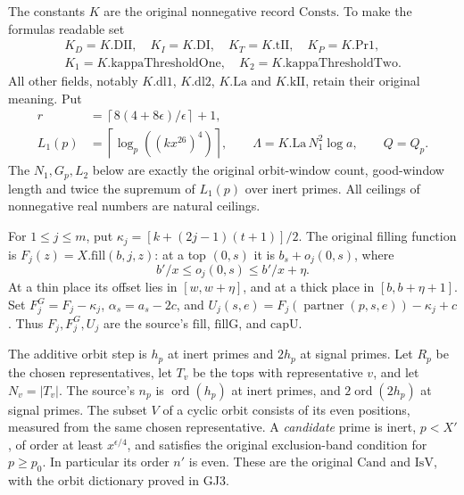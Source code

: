 The constants \(K\) are the original nonnegative record
\(\mathrm{Consts}\). To make the formulas readable set
\[
 \begin{gathered}
 K_D=K.\mathrm{DII},\quad K_I=K.\mathrm{DI},\quad
 K_T=K.\mathrm{tII},\quad K_P=K.\mathrm{Pr1},\\
 K_1=K.\mathrm{kappaThresholdOne},\quad
 K_2=K.\mathrm{kappaThresholdTwo}.
 \end{gathered}
\]
All other fields, notably \(K.\mathrm{dl1}\), \(K.\mathrm{dl2}\),
\(K.\mathrm{La}\) and \(K.\mathrm{kII}\), retain their original
meaning. Put
\[
 \begin{split}
 r&=\left\lceil8(4+8\epsilon)/\epsilon\right\rceil+1,\\
 L_1(p)&=\left\lceil\log_p((kx^{26})^4)\right\rceil,\qquad
 \Lambda=K.\mathrm{La}\,N_1^2\log a,\qquad Q=Q_p .
 \end{split}                                                       \tag{GLG.3}
\]
The \(N_1,G_p,L_2\) below are exactly the original orbit-window count,
good-window length and twice the supremum of \(L_1(p)\) over inert
primes. All ceilings of nonnegative real numbers are natural ceilings.

For \(1\le j\le m\), put
\(\kappa_j=[k+(2j-1)(t+1)]/2\).
The original filling function is \(F_j(z)=X.\mathrm{fill}(b,j,z)\):
at a top \((0,s)\) it is \(b_s+o_j(0,s)\), where
\[
 b'/x\le o_j(0,s)\le b'/x+\eta.
\]
At a thin place its offset lies in \([w,w+\eta]\), and at a thick
place in \([b,b+\eta+1]\). Set
\(F_j^G=F_j-\kappa_j\), \(\alpha_s=a_s-2c\), and
\(U_j(s,e)=F_j(\operatorname{partner}(p,s,e))-\kappa_j+c\).
Thus \(F_j,F_j^G,U_j\) are the source's \(\mathrm{fill}\),
\(\mathrm{fillG}\), and \(\mathrm{capU}\).

The additive orbit step is \(h_p\) at inert primes and \(2h_p\)
at signal primes. Let \(R_p\) be the chosen representatives, let
\(T_v\) be the tops with representative \(v\), and let \(N_v=|T_v|\).
The source's \(n_p\) is \(\operatorname{ord}(h_p)\) at inert primes,
and \(2\operatorname{ord}(2h_p)\) at signal primes. The subset \(V\)
of a cyclic orbit consists of its even positions, measured from the
same chosen representative. A \emph{candidate} prime is inert,
\(p<X'\), of order at least \(x^{\epsilon/4}\), and satisfies the
original exclusion-band condition for \(p\ge p_0\). In particular
its order \(n'\) is even. These are the original \(\mathrm{Cand}\)
and \(\mathrm{IsV}\), with the orbit dictionary proved in GJ3.

